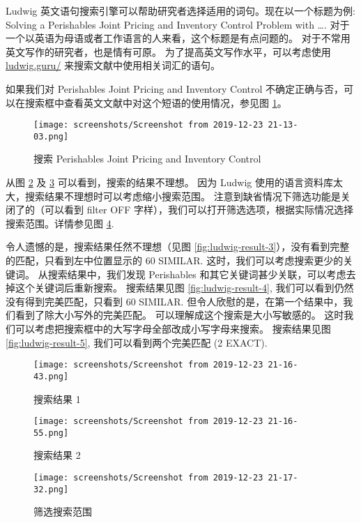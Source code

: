 \documentclass[
    11pt,
    cite=authoryear,
    device=normal,
    lang=cn,
    mode=simple,
    result=answer,
    toc=onecol,
]{elegantbook_sierxue}
\begin{document}
Ludwig 英文语句搜索引擎可以帮助研究者选择适用的词句。现在以一个标题为例:
Solving a Perishables Joint Pricing and Inventory Control Problem
with \ldots.
对于一个以英语为母语或者工作语言的人来看，这个标题是有点问题的。
对于不常用英文写作的研究者，也是情有可原。
为了提高英文写作水平，可以考虑使用
\href{https://ludwig.guru/}{ludwig.guru/} 来搜索文献中使用相关词汇的语句。

如果我们对 Perishables Joint Pricing and Inventory Control
不确定正确与否，可以在搜索框中查看英文文献中对这个短语的使用情况，参见图
\ref{fig:ludwig-search}。

\begin{figure}[!htbp]
  \centering
  \texttt{[image: screenshots/Screenshot from
  2019-12-23 21-13-03.png]}
  \caption{搜索 Perishables Joint Pricing and Inventory Control}
  \label{fig:ludwig-search}
\end{figure}

从图 \ref{fig:ludwig-result-1} 及 \ref{fig:ludwig-result-2}
可以看到，搜索的结果不理想。
因为 Ludwig 使用的语言资料库太大，搜索结果不理想时可以考虑缩小搜索范围。
注意到缺省情况下筛选功能是关闭了的（可以看到 filter OFF
字样），我们可以打开筛选选项，根据实际情况选择搜索范围。详情参见图
\ref{fig:ludwig-filter}.

令人遗憾的是，搜索结果任然不理想（见图
\ref{fig:ludwig-result-3}），没有看到完整的匹配，只看到左中位置显示的 60
SIMILAR.
这时，我们可以考虑搜索更少的关键词。
从搜索结果中，我们发现 Perishables
和其它关键词甚少关联，可以考虑去掉这个关键词后重新搜索。
搜索结果见图 \ref{fig:ludwig-result-4},
我们可以看到仍然没有得到完美匹配，只看到 60 SIMILAR.
但令人欣慰的是，在第一个结果中，我们看到了除大小写外的完美匹配。
可以理解成这个搜索是大小写敏感的。
这时我们可以考虑把搜索框中的大写字母全部改成小写字母来搜索。
搜索结果见图 \ref{fig:ludwig-result-5}, 我们可以看到两个完美匹配
(2 EXACT).

\begin{figure}[!htbp]
  \centering
  \texttt{[image: screenshots/Screenshot from
  2019-12-23 21-16-43.png]}
  \caption{搜索结果 1}
  \label{fig:ludwig-result-1}
\end{figure}

\begin{figure}[!htbp]
  \centering
  \texttt{[image: screenshots/Screenshot from
  2019-12-23 21-16-55.png]}
  \caption{搜索结果 2}
  \label{fig:ludwig-result-2}
\end{figure}

\begin{figure}[!htbp]
  \centering
  \texttt{[image: screenshots/Screenshot from
  2019-12-23 21-17-32.png]}
  \caption{筛选搜索范围}
  \label{fig:ludwig-filter}
\end{figure}
\end{document}
